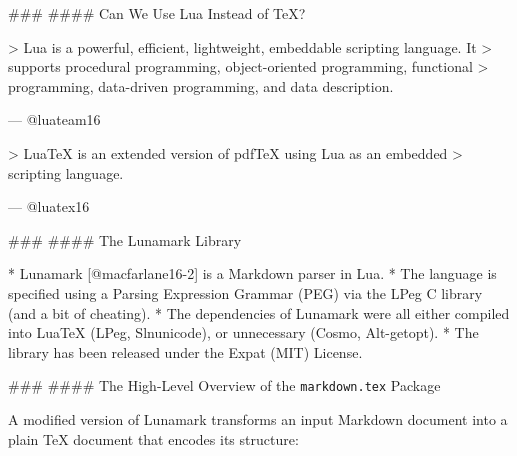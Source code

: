 \documentclass{beamer}
\begin{document}
\begin{darkframes}
\begin{frame}
\end{frame}
\begin{frame}

### \subsecname
#### Can We Use Lua Instead of \TeX?

> Lua is a powerful, efficient, lightweight, embeddable scripting language. It
> supports procedural programming, object-oriented programming, functional
> programming, data-driven programming, and data description. 

\hfill --- @luateam16
\vfill

> Lua\TeX{} is an extended version of pdf\TeX{} using Lua as an embedded
> scripting language.

\hfill --- @luatex16

\end{frame}
\begin{frame}

### \subsecname
#### The Lunamark Library

  * Lunamark [@macfarlane16-2] is a Markdown parser in Lua.
  * The language is specified using a Parsing Expression Grammar
    (PEG) via the LPeg C library (and a bit of cheating).
  * The dependencies of Lunamark were all either
    compiled into Lua\TeX{}
    (LPeg, Slnunicode), or unnecessary (Cosmo, Alt-getopt).
  * The library has been released under the Expat (MIT) License.

\end{frame}
\begin{frame}

### \subsecname
#### The High-Level Overview of the \texttt{markdown.tex} Package

A modified version of Lunamark transforms an input Markdown document into a
plain \TeX{} document that encodes its structure:


\end{frame}
\end{darkframes}
\end{document}
